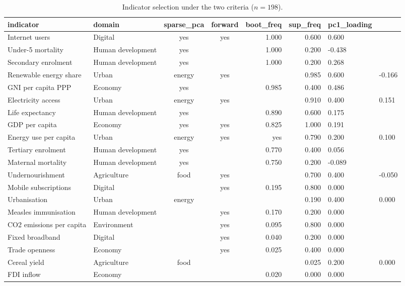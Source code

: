 \begin{table}[t]
\centering
\caption{Indicator selection under the two criteria ($n=198$).}
\label{tab:selection}
\small
\begin{tabular}{llccrr}
\toprule
\textbf{indicator} & \textbf{domain} & \textbf{sparse_pca} & \textbf{forward} & \textbf{boot_freq} & \textbf{sup_freq} & \textbf{pc1_loading} \\
\midrule
Internet users & Digital & yes & yes & 1.000 & 0.600 & 0.600 \\
Under-5 mortality & Human development & yes &  & 1.000 & 0.200 & -0.438 \\
Secondary enrolment & Human development & yes &  & 1.000 & 0.200 & 0.268 \\
Renewable energy share & Urban & energy & yes &  & 0.985 & 0.600 & -0.166 \\
GNI per capita PPP & Economy & yes &  & 0.985 & 0.400 & 0.486 \\
Electricity access & Urban & energy & yes &  & 0.910 & 0.400 & 0.151 \\
Life expectancy & Human development & yes &  & 0.890 & 0.600 & 0.175 \\
GDP per capita & Economy & yes & yes & 0.825 & 1.000 & 0.191 \\
Energy use per capita & Urban & energy & yes & yes & 0.790 & 0.200 & 0.100 \\
Tertiary enrolment & Human development & yes &  & 0.770 & 0.400 & 0.056 \\
Maternal mortality & Human development & yes &  & 0.750 & 0.200 & -0.089 \\
Undernourishment & Agriculture & food & yes &  & 0.700 & 0.400 & -0.050 \\
Mobile subscriptions & Digital &  & yes & 0.195 & 0.800 & 0.000 \\
Urbanisation & Urban & energy &  &  & 0.190 & 0.400 & 0.000 \\
Measles immunisation & Human development &  & yes & 0.170 & 0.200 & 0.000 \\
CO2 emissions per capita & Environment &  & yes & 0.095 & 0.800 & 0.000 \\
Fixed broadband & Digital &  & yes & 0.040 & 0.200 & 0.000 \\
Trade openness & Economy &  & yes & 0.025 & 0.400 & 0.000 \\
Cereal yield & Agriculture & food &  &  & 0.025 & 0.200 & 0.000 \\
FDI inflow & Economy &  &  & 0.020 & 0.000 & 0.000 \\

\end{tabular}
\end{table}

